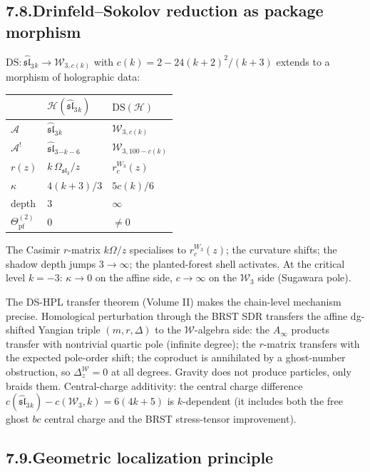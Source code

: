 \documentclass[11pt,reqno]{amsart}
\theoremstyle{definition}
\theoremstyle{remark}
\providecommand{\cA}{\mathcal{A}}
\providecommand{\cH}{\mathcal{H}}
\providecommand{\cW}{\mathcal{W}}
\providecommand{\fsl}{\mathfrak{sl}}
\numberwithin{equation}{section}
\begin{document}
\subsection*{7.8.\quad Drinfeld--Sokolov reduction as package morphism}

$\mathrm{DS}\colon \widehat{\mathfrak{sl}}_3{}_k \to \cW_{3,c(k)}$
with $c(k) = 2 - 24(k+2)^2/(k+3)$ extends to a morphism of
holographic data:
\begin{center}
\renewcommand{\arraystretch}{1.15}
\begin{tabular}{lll}
& $\cH(\widehat{\mathfrak{sl}}_3{}_k)$
 & $\mathrm{DS}(\cH)$\\
\hline
$\cA$ & $\widehat{\mathfrak{sl}}_3{}_k$ & $\cW_{3,c(k)}$\\
$\cA^!$ & $\widehat{\mathfrak{sl}}_3{}_{-k-6}$ & $\cW_{3,100-c(k)}$\\
$r(z)$ & $k\,\Omega_{\mathfrak{sl}_3}/z$ & $r_c^{W_3}(z)$\\
$\kappa$ & $4(k+3)/3$ & $5c(k)/6$\\
depth & $3$ & $\infty$\\
$\Theta^{(2)}_{\mathrm{pf}}$ & $0$ & $\neq 0$
\end{tabular}
\end{center}
The Casimir $r$-matrix $k\Omega/z$ specialises to
$r_c^{W_3}(z)$; the curvature shifts; the shadow depth jumps
$3 \to \infty$; the planted-forest shell activates. At the
critical level $k = -3$: $\kappa \to 0$ on the affine side,
$c \to \infty$ on the $\cW_3$ side (Sugawara pole).

The DS-HPL transfer theorem (Volume II) makes the chain-level
mechanism precise. Homological perturbation through the BRST
SDR transfers the affine dg-shifted Yangian triple
$(m, r, \Delta)$ to the $\cW$-algebra side: the $A_\infty$
products transfer with nontrivial quartic pole (infinite
degree); the $r$-matrix transfers with the expected pole-order
shift; the coproduct is annihilated by a ghost-number
obstruction, so $\Delta_z^\cW = 0$ at all degrees. Gravity
does not produce particles, only braids them. Central-charge
additivity: the central charge difference
$c(\widehat{\fsl}_3{}_k) - c(\cW_3, k) = 6(4k{+}5)$
is $k$-dependent (it includes both the free ghost $bc$ central charge
and the BRST stress-tensor improvement).

\subsection*{7.9.\quad Geometric localization principle}
\end{document}
